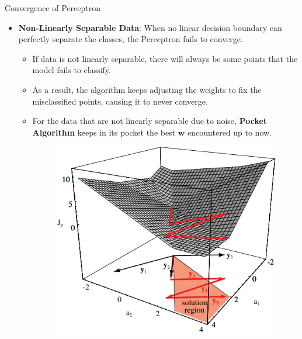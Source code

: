\documentclass[serif, aspectratio=169]{beamer}
\begin{document}
\begin{frame}{Convergence of Perceptron}
    \begin{itemize}\itemsep1.5em
        \item \textbf{Non-Linearly Separable Data}:
        When no linear decision boundary can perfectly separate the classes, the Perceptron fails to converge.
        \medskip
        \begin{itemize}\itemsep1em
            \item If data is not linearly separable, there will always be some points that the model fails to classify.
            \item As a result, the algorithm keeps adjusting the weights to fix the misclassified points, causing it to never converge.
            \item For the data that are not linearly separable due to noise, \textbf{Pocket Algorithm} keeps in its pocket the best \(\mathbf{w}\) encountered up to now.
        \endminipage
        \hspace{1.5cm}
        \begin{figure}
            \centering
            \includegraphics[width=.9\linewidth]{pic/Figure_15.png}
        \end{figure}
        \endminipage
        \end{itemize}
    \end{itemize}
\end{frame}
\end{document}
